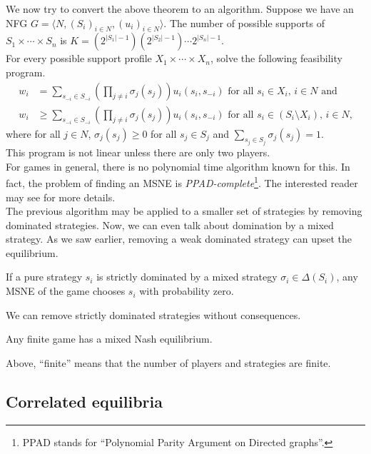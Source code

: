 	We now try to convert the above theorem to an algorithm. Suppose we have an NFG $G = \langle N , (S_i)_{i \in N} , (u_i)_{i \in N} \rangle$. The number of possible supports of $S_1 \times \cdots \times S_n$ is $K = (2^{|S_1|-1})(2^{|S_2|-1})\cdots2^{|S_n|-1}$.\\
	For every possible support profile $X_1 \times \cdots \times X_n$, solve the following feasibility program.
	\begin{align*}
		w_i &= \sum_{s_{-i} \in S_{-i}} \left( \prod_{j \ne i} \sigma_j(s_j) \right) u_i(s_i,s_{-i}) \text{ for all $s_i \in X_i$, $i \in N$ and} \\
		w_i &\ge \sum_{s_{-i} \in S_{-i}} \left( \prod_{j \ne i} \sigma_j(s_j) \right) u_i(s_i,s_{-i}) \text{ for all $s_i \in (S_i \setminus X_i)$, $i \in N$,}
	\end{align*}
	where for all $j \in N$, $\sigma_j(s_j) \ge 0$ for all $s_j \in S_j$ and $\sum_{s_j \in S_j} \sigma_j(s_j) = 1$.\\
	This program is not linear unless there are only two players.\\
	For games in general, there is no polynomial time algorithm known for this. In fact, the problem of finding an MSNE is \emph{PPAD-complete}\footnote{PPAD stands for ``Polynomial Parity Argument on Directed graphs''.}. The interested reader may see \cite{Daskalakis2009TheCO} for more details.\\

	The previous algorithm may be applied to a smaller set of strategies by removing dominated strategies. Now, we can even talk about domination by a mixed strategy. As we saw earlier, removing a weak dominated strategy can upset the equilibrium. 

	\begin{ftheo}
		If a pure strategy $s_i$ is strictly dominated by a mixed strategy $\sigma_i \in \Delta(S_i)$, any MSNE of the game chooses $s_i$ with probability zero.
	\end{ftheo}
	We can remove strictly dominated strategies without consequences.

	\begin{ftheo}
		Any finite game has a mixed Nash equilibrium.
	\end{ftheo}
	Above, ``finite'' means that the number of players and strategies are finite.


\subsection{Correlated equilibria}

